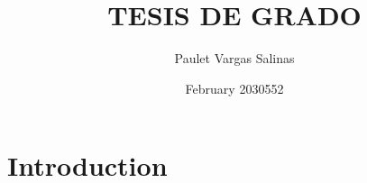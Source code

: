 \documentclass{article}
\title{TESIS DE GRADO}
\author{Paulet Vargas Salinas}
\date{February 2030552}
\begin{document}
\maketitle

\section{Introduction}
\end{document}
